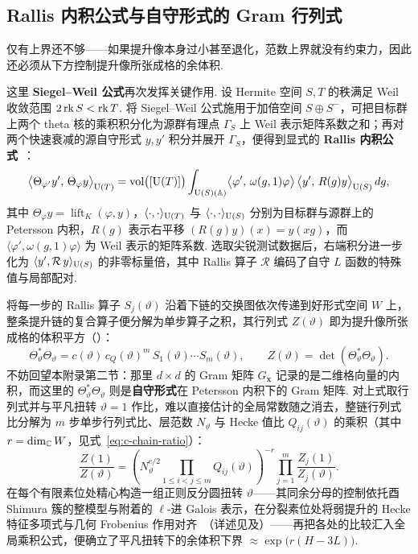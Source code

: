 \subsection{Rallis 内积公式与自守形式的 Gram 行列式}

仅有上界还不够——如果提升像本身过小甚至退化，范数上界就没有约束力，因此还必须从下方控制提升像所张成格的余体积.

这里 \textbf{Siegel--Weil 公式}再次发挥关键作用. 设 Hermite 空间 $S,T$ 的秩满足 Weil 收敛范围 $2\operatorname{rk} S<\operatorname{rk} T$. 将 Siegel--Weil 公式施用于加倍空间 $S\oplus S^-$，可把目标群上两个 theta 核的乘积积分化为源群有理点 $\Gamma_S$ 上 Weil 表示矩阵系数之和；再对两个快速衰减的源自守形式 $y,y'$ 积分并展开 $\Gamma_S$，便得到显式的 \textbf{Rallis 内积公式}~\cite{Li1992,KudlaRallis1994,GQT2014}：
\[
\bigl\langle \Theta_{\varphi'}y',\,\Theta_\varphi y\bigr\rangle_{\operatorname{U}(T)}
=\operatorname{vol}\bigl([\operatorname{U}(T)]\bigr)
 \int_{\operatorname{U}(S)(\mathbb{A})}
   \bigl\langle \varphi',\,\omega(g,1)\varphi\bigr\rangle\,
   \bigl\langle y',\,R(g)y\bigr\rangle_{\operatorname{U}(S)}\,dg,
\]
其中 $\Theta_\varphi y=\operatorname{lift}_K(\varphi,y)$，$\langle\cdot,\cdot\rangle_{\operatorname{U}(T)}$ 与 $\langle\cdot,\cdot\rangle_{\operatorname{U}(S)}$ 分别为目标群与源群上的 Petersson 内积，$R(g)$ 表示右平移 $(R(g)y)(x)=y(xg)$，而 $\langle\varphi',\omega(g,1)\varphi\rangle$ 为 Weil 表示的矩阵系数. 选取尖锐测试数据后，右端积分进一步化为 $\langle y',\mathcal R\,y\rangle_{\operatorname{U}(S)}$ 的非零标量倍，其中 Rallis 算子 $\mathcal R$ 编码了自守 $L$ 函数的特殊值与局部配对.

将每一步的 Rallis 算子 $S_j(\vartheta)$ 沿着下链的交换图依次传递到好形式空间 $W$ 上，整条提升链的复合算子便分解为单步算子之积，其行列式 $Z(\vartheta)$ 即为提升像所张成格的体积平方（）：
\[
\Theta_\vartheta^*\Theta_\vartheta
=c(\vartheta)\,c_Q(\vartheta)^m\,S_1(\vartheta)\cdots S_m(\vartheta),
\qquad
Z(\vartheta)=\det(\Theta_\vartheta^*\Theta_\vartheta).
\]
不妨回望本附录第二节：那里 $d\times d$ 的 Gram 矩阵 $G_{\mathbf x}$ 记录的是二维格向量的内积，而这里的 $\Theta_\vartheta^*\Theta_\vartheta$ 则是\textbf{自守形式}在 Petersson 内积下的 Gram 矩阵. 对上式取行列式并与平凡扭转 $\vartheta=1$ 作比，难以直接估计的全局常数随之消去，整链行列式比分解为 $m$ 步单步行列式比、层范数 $N_\vartheta$ 与 Hecke 值比 $Q_{ij}(\vartheta)$ 的乘积（其中 $r=\dim_{\mathbb{C}}W$，见式~\eqref{eq:c-chain-ratio}）：
\[
\frac{Z(1)}{Z(\vartheta)}
=\left(N_\vartheta^{e/2}\prod_{1\le i<j\le m}Q_{ij}(\vartheta)\right)^{-r}
 \prod_{j=1}^{m}\frac{Z_j(1)}{Z_j(\vartheta)}.
\]
在每个有限素位处精心构造一组正则反分圆扭转 $\vartheta$——其同余分母的控制依托酉 Shimura 簇的整模型与附着的 $\ell$-进 Galois 表示，在分裂素位处将弱提升的 Hecke 特征多项式与几何 Frobenius 作用对齐~\cite{Shin2011,ChenevierHarris2013,BLGGT2014}（详述见及）——再把各处的比较汇入全局乘积公式，便确立了平凡扭转下的余体积下界 $\approx\exp\bigl(r(H-3L)\bigr)$.

